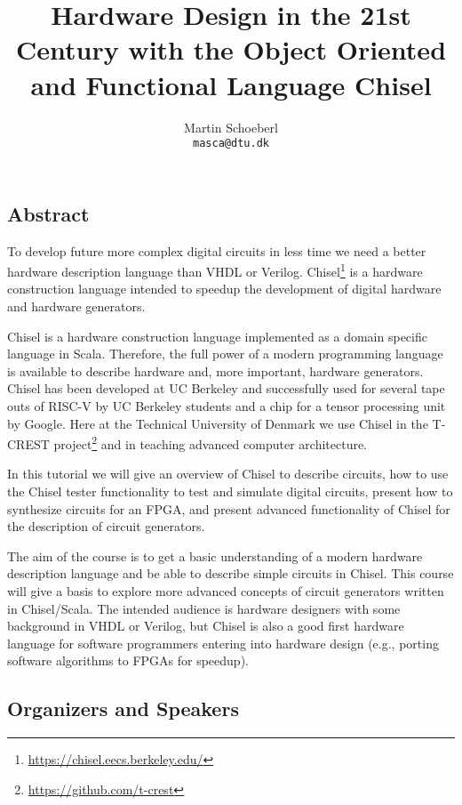 \documentclass{article}
\begin{document}
\title{Hardware Design in the 21st Century with the Object Oriented and Functional Language Chisel}

\author{Martin Schoeberl\\
\texttt{masca@dtu.dk}}


\maketitle \thispagestyle{empty}

\subsection*{Abstract}

To develop future more complex digital circuits in less time we need a better hardware description
language than VHDL or Verilog. Chisel\footnote{\url{https://chisel.eecs.berkeley.edu/}} is a hardware construction language intended to
speedup the development of digital hardware and hardware generators.

Chisel is a hardware construction language implemented as a domain specific language in Scala.
Therefore, the full power of a modern programming language is available to describe hardware and,
more important, hardware generators.
Chisel has been developed at UC Berkeley and successfully used for several tape outs of RISC-V
by UC Berkeley students and a chip for a tensor processing unit by Google.
Here at the Technical University of Denmark we use Chisel in the T-CREST project\footnote{\url{https://github.com/t-crest}} and
in teaching advanced computer architecture.

In this tutorial we will give an overview of Chisel to describe circuits, how to use the Chisel tester functionality to test and simulate digital circuits, present how to synthesize circuits for an FPGA, and present advanced functionality of Chisel for the description of circuit generators.

The aim of the course is to get a basic understanding of a modern hardware description language and be able to describe simple circuits in Chisel. This course will give a basis to explore more advanced concepts of circuit generators written in Chisel/Scala. The intended audience is hardware designers with some background in VHDL or Verilog, but Chisel is also a good first hardware language for software programmers entering into hardware design
(e.g., porting software algorithms to FPGAs for speedup).

\subsection*{Organizers and Speakers}
\end{document}
